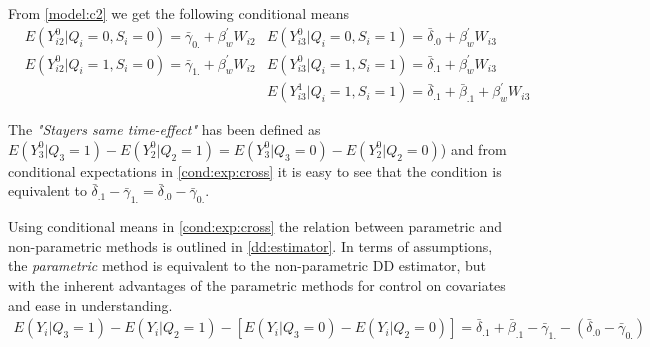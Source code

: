 \documentclass[12pt]{article}
\begin{document}
From \ref{model:c2} we get the following conditional means
\begin{align*}\label{cond:exp:cross}
&E(Y_{i2}^0|Q_{i}=0,S_i=0)=\bar{\gamma}_{0.}+\beta_w^\prime W_{i2} & E(Y_{i3}^0|Q_{i}=0,S_i=1)=\bar{\delta}_{.0}+\beta_w^\prime W_{i3} \\ 
& E(Y_{i2}^0|Q_{i}=1,S_i=0)=\bar{\gamma}_{1.}+\beta_w^\prime W_{i2} & E(Y_{i3}^0|Q_{i}=1,S_i=1)=\bar{\delta}_{.1}+\beta_w^\prime W_{i3}\\
& & E(Y_{i3}^1|Q_{i}=1,S_i=1)=\bar{\delta}_{.1}+\bar{\beta}_{.1}+\beta_w^\prime W_{i3} \tag{$CE_2$}
\end{align*}

The \textit{"Stayers same time-effect"} has been defined as
$E(Y_3^0| Q_3=1) - E(Y_2^0| Q_2=1) = E(Y_3^0| Q_3=0) - E(Y_2^0| Q_2=0)$) and from conditional expectations in \ref{cond:exp:cross} it is easy to see that the condition is equivalent to $\bar{\delta}_{.1}- \bar{\gamma}_{1.} =\bar{\delta}_{.0}-\bar{\gamma}_{0.}$. 

Using conditional means in \ref{cond:exp:cross} the relation between parametric and non-parametric methods is outlined in \ref{dd:estimator}. In terms of assumptions, the \textit{parametric} method is equivalent to the non-parametric DD estimator, but with the inherent advantages of the parametric methods for control on covariates and ease in understanding.
\begin{align*}\label{dd:estimator}
E(Y_i| Q_3=1) - E(Y_i| Q_2=1) - [E(Y_i| Q_3=0) - E(Y_i| Q_2=0)] = \bar{\delta}_{.1}+\bar{\beta}_{.1} - \bar{\gamma}_{1.} - (\bar{\delta}_{.0}-\bar{\gamma}_{0.}) \tag{DD}
\end{align*}
\end{document}
